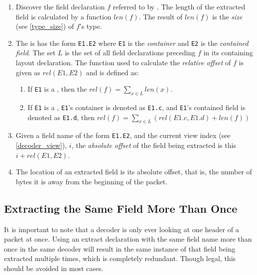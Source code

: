 \begin{enumerate}
\item Discover the field declaration $f$ referred to by . The length of the extracted field is calculated by a function $len(f)$. The result of $len(f)$ is the \textit{size} (see \ref{type_size}) of $f$'s type.

\item The  is has the form \texttt{E1.E2} where \texttt{E1} is the \textit{container} and \texttt{E2} is the \textit{contained field}. The set $L$ is the set of all field declarations preceding $f$ in its containing layout declaration. The function used to calculate the \textit{relative offset} of $f$ is given as $rel(E1, E2)$ and is defined as:

\begin{enumerate}

\item If \texttt{E1} is a , then the $rel(f) = \sum_{x \in L}{} len(x)$.

\item If \texttt{E1} is a , \texttt{E1}'s container is denoted as \texttt{E1.c}, and \texttt{E1}'s contained field is denoted as \texttt{E1.d}, then $rel(f) = \sum_{x \in L}{} ( rel(E1.c, E1.d) + len(f) )$

\end{enumerate}

\item Given a field name of the form \texttt{E1.E2}, and the current view index (see \ref{decoder_view}), $i$, the \textit{absolute offset} of the field being extracted is this $i + rel(E1, E2)$.

\item The location of an extracted field is its absolute offset, that is, the number of bytes it is away from the beginning of the packet.
\end{enumerate}

\subsection{Extracting the Same Field More Than Once}

It is important to note that a decoder is only ever looking at one header of a packet at once. Using an extract declaration with the same field name more than once in the same decoder will result in the same instance of that field being extracted multiple times, which is completely redundant. Though legal, this should be avoided in most cases.

